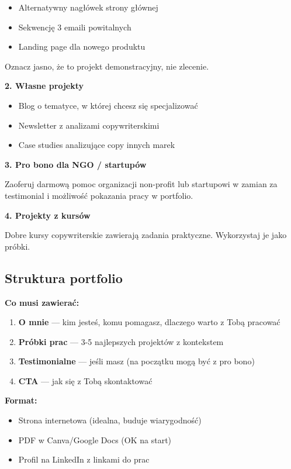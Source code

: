 \documentclass[
  12pt,
  a4paper,
  twoside,
  openright,
  12pt,
  DIV=12,
  BCOR=12mm]{scrbook}
\providecommand{\tightlist}{%
  \setlength{\itemsep}{0pt}\setlength{\parskip}{0pt}}\usepackage{longtable,booktabs,array}
\begin{document}
\begin{itemize}
\tightlist
\item
  Alternatywny nagłówek strony głównej
\item
  Sekwencję 3 emaili powitalnych
\item
  Landing page dla nowego produktu
\end{itemize}

Oznacz jasno, że to projekt demonstracyjny, nie zlecenie.

\textbf{2. Własne projekty}

\begin{itemize}
\tightlist
\item
  Blog o tematyce, w której chcesz się specjalizować
\item
  Newsletter z analizami copywriterskimi
\item
  Case studies analizujące copy innych marek
\end{itemize}

\textbf{3. Pro bono dla NGO / startupów}

Zaoferuj darmową pomoc organizacji non-profit lub startupowi w zamian za
testimonial i możliwość pokazania pracy w portfolio.

\textbf{4. Projekty z kursów}

Dobre kursy copywriterskie zawierają zadania praktyczne. Wykorzystaj je
jako próbki.

\subsection{Struktura portfolio}\label{struktura-portfolio}

\textbf{Co musi zawierać:}

\begin{enumerate}
\def\labelenumi{\arabic{enumi}.}
\tightlist
\item
  \textbf{O mnie} --- kim jesteś, komu pomagasz, dlaczego warto z Tobą
  pracować
\item
  \textbf{Próbki prac} --- 3-5 najlepszych projektów z kontekstem
\item
  \textbf{Testimonialne} --- jeśli masz (na początku mogą być z pro
  bono)
\item
  \textbf{CTA} --- jak się z Tobą skontaktować
\end{enumerate}

\textbf{Format:}

\begin{itemize}
\tightlist
\item
  Strona internetowa (idealna, buduje wiarygodność)
\item
  PDF w Canva/Google Docs (OK na start)
\item
  Profil na LinkedIn z linkami do prac
\end{itemize}
\end{document}
